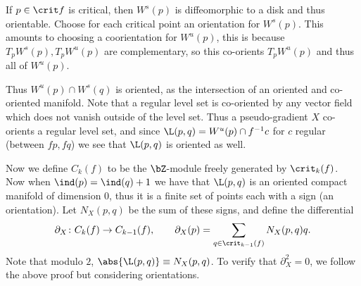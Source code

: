     If $p\in\crit f$ is critical, then $W^s(p)$ is diffeomorphic to a disk and thus orientable.
    Choose for each critical point an orientation for $W^s(p)$.
    This amounts to choosing a coorientation for $W^u(p)$, this is because $T_pW^s(p),T_pW^u(p)$ are
    complementary, so this co-orients $T_pW^u(p)$ and thus all of $W^u(p)$.

    Thus $W^u(p)\cap W^s(q)$ is oriented, as the intersection of an oriented and co-oriented manifold.
    Note that a regular level set is co-oriented by any vector field which does not vanish outside of the
    level set.
    Thus a pseudo-gradient $X$ co-orients a regular level set, and since $\L(p,q)=W^u(p)\cap f^{-1}c$
    for $c$ regular (between $fp,fq$) we see that $\L(p,q)$ is oriented as well.

    Now we define $C_k(f)$ to be the $\bZ$-module freely generated by $\crit_k(f)$.
    Now when $\ind(p)=\ind(q)+1$ we have that $\L(p,q)$ is an oriented compact manifold of dimension $0$,
    thus it is a finite set of points each with a sign (an orientation).
    Let $N_X(p,q)$ be the sum of these signs, and define the differential
    $$ \partial_X\colon C_k(f) \to C_{k-1}(f),\qquad \partial_X(p) = \sum_{q\in\crit_{k-1}(f)}N_X(p,q)q . $$
    Note that modulo $2$, $\abs{\L(p,q)}\equiv N_X(p,q)$.
    To verify that $\partial_X^2=0$, we follow the above proof but considering orientations.

\eremark

